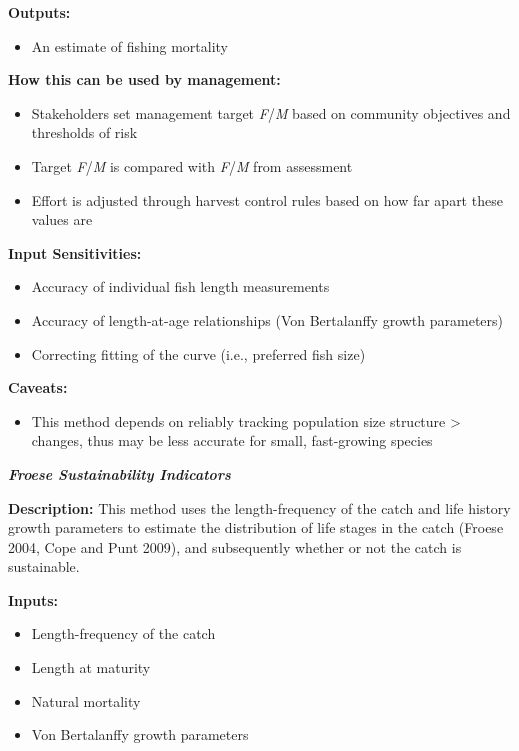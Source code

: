 \documentclass[]{book}
\providecommand{\tightlist}{%
  \setlength{\itemsep}{0pt}\setlength{\parskip}{0pt}}
\begin{document}
\textbf{Outputs: }

\begin{itemize}
\tightlist
\item
  An estimate of fishing mortality
\end{itemize}

\textbf{How this can be used by management:}

\begin{itemize}
\item
  Stakeholders set management target \emph{F}/\emph{M} based on
  community objectives and thresholds of risk
\item
  Target \emph{F}/\emph{M} is compared with \emph{F}/\emph{M} from
  assessment
\item
  Effort is adjusted through harvest control rules based on how far
  apart these values are
\end{itemize}

\textbf{Input Sensitivities: }

\begin{itemize}
\item
  Accuracy of individual fish length measurements
\item
  Accuracy of length-at-age relationships (Von Bertalanffy growth
  parameters)
\item
  Correcting fitting of the curve (i.e., preferred fish size)
\end{itemize}

\textbf{Caveats:}

\begin{itemize}
\tightlist
\item
  This method depends on reliably tracking population size structure
  \textgreater{} changes, thus may be less accurate for small,
  fast-growing species
\end{itemize}

\textbf{\emph{Froese Sustainability Indicators}}

\textbf{Description:} This method uses the length-frequency of the catch
and life history growth parameters to estimate the distribution of life
stages in the catch (Froese 2004, Cope and Punt 2009), and subsequently
whether or not the catch is sustainable.

\textbf{Inputs: }

\begin{itemize}
\item
  Length-frequency of the catch
\item
  Length at maturity
\item
  Natural mortality
\item
  Von Bertalanffy growth parameters
\end{itemize}
\end{document}
